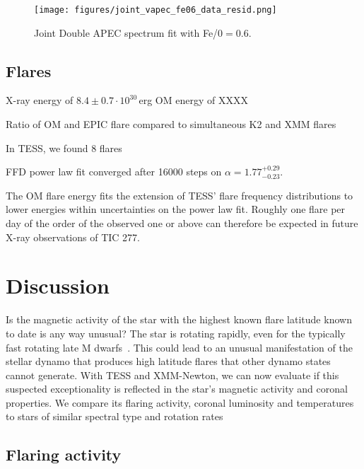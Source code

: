 \documentclass[twocolumn]{aastex631}
\begin{document}
\begin{figure}
    \begin{centering}
        \texttt{[image: figures/joint\_vapec\_fe06\_data\_resid.png]}
        \caption{
         Joint Double APEC spectrum fit with Fe/0$=0.6$.
        }
        \label{fig:spec_joint_all}
    \end{centering}
\end{figure}


\subsection{Flares}

X-ray energy of $8.4\pm0.7\cdot10^{30}\,$erg
OM energy of XXXX

Ratio of OM and EPIC flare compared to \citet{guarcello2019simultaneous} simultaneous K2 and XMM flares

In TESS, we found 8 flares

FFD power law fit converged after 16000 steps on $\alpha = 1.77_{-0.23}^{+0.29}$.

The OM flare energy fits the extension of TESS' flare frequency distributions to lower energies within uncertainties on the power law fit. Roughly one flare per day of the order of the observed one or above can therefore be expected in future X-ray observations of TIC 277.



\section{Discussion}
\label{sec:discussion}

Is the magnetic activity of the star with the highest known flare latitude known to date is any way unusual? The star is rotating rapidly, even for the typically fast rotating late M dwarfs~\citep{medina2022galactic}. This could lead to an unusual manifestation of the stellar dynamo that produces high latitude flares that other dynamo states cannot generate. With TESS and XMM-Newton, we can now evaluate if this suspected exceptionality is reflected in the star's magnetic activity and coronal properties. We compare its flaring activity, coronal luminosity and temperatures to stars of similar spectral type and rotation rates

\subsection{Flaring activity}
\label{sec:discussion:flares}
\end{document}
